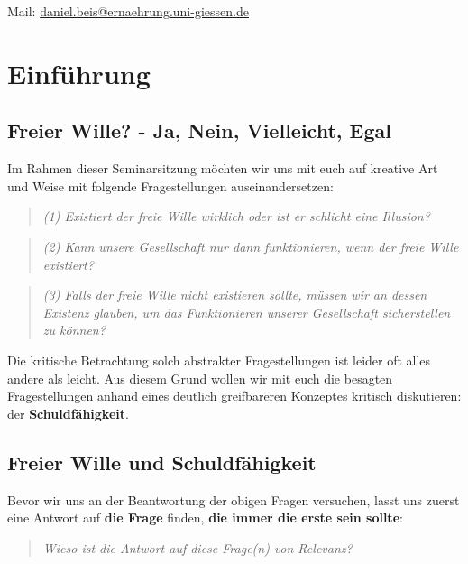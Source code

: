 \documentclass[
  a4paper,
]{report}
\begin{document}
Mail: \href{mailto:?subject=Seminar\%20Freier\%20Wille\%20als\%20Illusion\%20oder\%20Notwendigkeit\%20-\%20Universität\%20Konstanz}{daniel.beis@ernaehrung.uni-giessen.de}

\hypertarget{intro}{%
\chapter{Einführung}\label{intro}}

\hypertarget{freewill-ynmi}{%
\section{Freier Wille? - Ja, Nein, Vielleicht, Egal}\label{freewill-ynmi}}

Im Rahmen dieser Seminarsitzung möchten wir uns mit euch auf kreative Art und Weise mit folgende Fragestellungen auseinandersetzen:

\begin{quote}
\emph{(1) Existiert der freie Wille wirklich oder ist er schlicht eine Illusion?}
\end{quote}

\begin{quote}
\emph{(2) Kann unsere Gesellschaft nur dann funktionieren, wenn der freie Wille existiert?}
\end{quote}

\begin{quote}
\emph{(3) Falls der freie Wille nicht existieren sollte, müssen wir an dessen Existenz glauben, um das Funktionieren unserer Gesellschaft sicherstellen zu können?}
\end{quote}

Die kritische Betrachtung solch abstrakter Fragestellungen ist leider oft alles andere als leicht. Aus diesem Grund wollen wir mit euch die besagten Fragestellungen anhand eines deutlich greifbareren Konzeptes kritisch diskutieren: der \textbf{Schuldfähigkeit}.

\hypertarget{freewill-blame}{%
\section{Freier Wille und Schuldfähigkeit}\label{freewill-blame}}

Bevor wir uns an der Beantwortung der obigen Fragen versuchen, lasst uns zuerst eine Antwort auf \textbf{die Frage} finden, \textbf{die immer die erste sein sollte}:

\begin{quote}
\emph{Wieso ist die Antwort auf diese Frage(n) von Relevanz?}
\end{quote}
\end{document}
